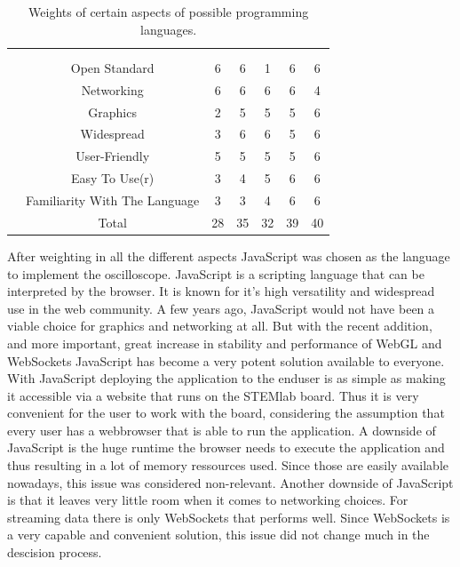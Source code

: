 \begin{table}
\begin{centering}
\setlength{\extrarowheight}{2pt}
\begin{tabular}{*{7}{c|}}
    \multicolumn{2}{c}{}        & \multicolumn{2}{c}{}\\\cline{3-7}
    \multicolumn{1}{c}{}    &   & \parbox[t]{2mm}{}%
                                & \parbox[t]{2mm}{}%
                                & \parbox[t]{2mm}{}%
                                & \parbox[t]{2mm}{}%
                                & \parbox[t]{2mm}{} \\
                & Open Standard & 6 & 6 & 1 & 6 & 6\\
                   & Networking & 6 & 6 & 6 & 6 & 4\\
                     & Graphics & 2 & 5 & 5 & 5 & 6\\
                   & Widespread & 3 & 6 & 6 & 5 & 6\\
                & User-Friendly & 5 & 5 & 5 & 5 & 6\\
               & Easy To Use(r) & 3 & 4 & 5 & 6 & 6\\
& Familiarity With The Language & 3 & 3 & 4 & 6 & 6\\
                       & Total &28 &35 &32 &39 & 40\\
\end{tabular}
\caption{Weights of certain aspects of possible programming languages.}
\label{fig:gui:language_choices}
\end{centering}
\end{table}

After weighting in all the different aspects JavaScript was chosen as the language to implement the oscilloscope. JavaScript is a scripting language that can be interpreted by the browser.
It is known for it's high versatility and widespread use in the web community.
A few years ago, JavaScript would not have been a viable choice for graphics and networking at all. But with the recent addition, and more important, great increase in stability and performance of WebGL and WebSockets JavaScript has become a very potent solution available to everyone.
With JavaScript deploying the application to the enduser is as simple as making it accessible via a website that runs on the STEMlab board. Thus it is very convenient for the user to work with the board, considering the assumption that every user has a webbrowser that is able to run the application.
A downside of JavaScript is the huge runtime the browser needs to execute the application and thus resulting in a lot of memory ressources used. Since those are easily available nowadays, this issue was considered non-relevant.
Another downside of JavaScript is that it leaves very little room when it comes to networking choices. For streaming data there is only WebSockets that performs well. Since WebSockets is a very capable and convenient solution, this issue did not change much in the descision process.

